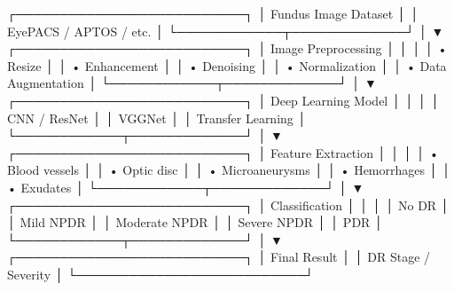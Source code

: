 
                      ┌──────────────────────────┐
                │   Fundus Image Dataset   │
                │ EyePACS / APTOS / etc.   │
                └────────────┬─────────────┘
                             │
                             ▼
                ┌──────────────────────────┐
                │   Image Preprocessing    │
                │                          │
                │ • Resize                 │
                │ • Enhancement            │
                │ • Denoising              │
                │ • Normalization          │
                │ • Data Augmentation      │
                └────────────┬─────────────┘
                             │
                             ▼
                ┌──────────────────────────┐
                │   Deep Learning Model    │
                │                          │
                │      CNN / ResNet        │
                │      VGGNet              │
                │      Transfer Learning   │
                └────────────┬─────────────┘
                             │
                             ▼
                ┌──────────────────────────┐
                │   Feature Extraction     │
                │                          │
                │ • Blood vessels          │
                │ • Optic disc             │
                │ • Microaneurysms         │
                │ • Hemorrhages            │
                │ • Exudates               │
                └────────────┬─────────────┘
                             │
                             ▼
                ┌──────────────────────────┐
                │     Classification       │
                │                          │
                │  No DR                   │
                │  Mild NPDR               │
                │  Moderate NPDR           │
                │  Severe NPDR             │
                │  PDR                     │
                └────────────┬─────────────┘
                             │
                             ▼
                ┌──────────────────────────┐
                │       Final Result       │
                │   DR Stage / Severity    │
                └──────────────────────────┘
